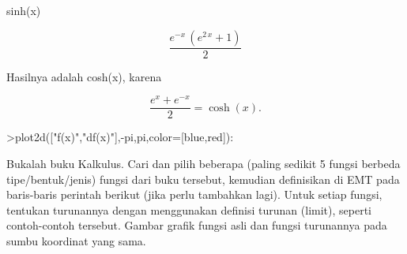 \documentclass{article}
\begin{document}
\begin{eulernotebook}
\begin{eulercomment}
\begin{eulercomment}
\begin{euleroutput}
                                 sinh(x)
  
\end{euleroutput}
\begin{eulerformula}
\[
\frac{e^ {- x }\,\left(e^{2\,x}+1\right)}{2}
\]
\end{eulerformula}
\begin{eulercomment}
Hasilnya adalah cosh(x), karena

\end{eulercomment}
\begin{eulerformula}
\[
\frac{e^x+e^{-x}}{2}=\cosh(x).
\]
\end{eulerformula}
\begin{eulerprompt}
>plot2d(["f(x)","df(x)"],-pi,pi,color=[blue,red]):
\end{eulerprompt}
\begin{eulercomment}
Bukalah buku Kalkulus. Cari dan pilih beberapa (paling sedikit 5
fungsi berbeda tipe/bentuk/jenis) fungsi dari buku tersebut, kemudian
definisikan di EMT pada baris-baris perintah berikut (jika perlu
tambahkan lagi). Untuk setiap fungsi, tentukan turunannya dengan
menggunakan definisi turunan (limit), seperti contoh-contoh tersebut.
Gambar grafik fungsi asli dan fungsi turunannya pada sumbu koordinat
yang sama.


\end{eulercomment}
\end{eulercomment}
\end{eulercomment}
\end{eulernotebook}
\end{document}
